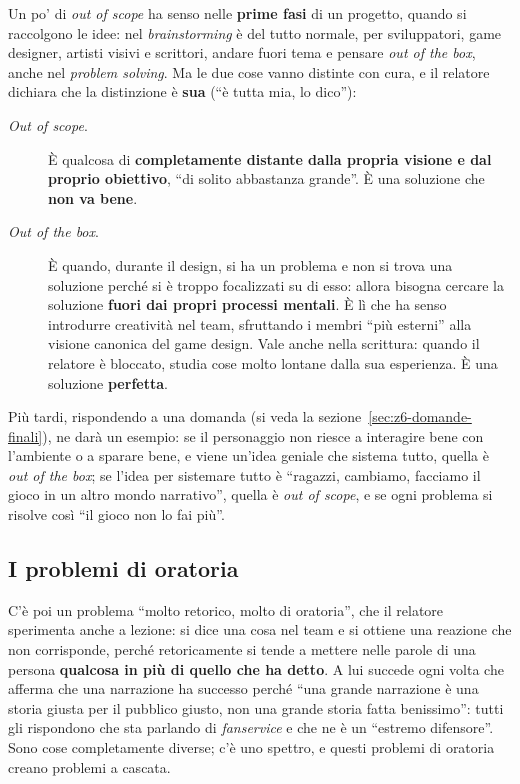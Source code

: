 Un po' di \emph{out of scope} ha senso nelle \textbf{prime fasi} di un progetto,
quando si raccolgono le idee: nel \emph{brainstorming} è del tutto normale, per
sviluppatori, game designer, artisti visivi e scrittori, andare fuori tema e
pensare \emph{out of the box}, anche nel \emph{problem solving}. Ma le due cose
vanno distinte con cura, e il relatore dichiara che la distinzione è
\textbf{sua} (``è tutta mia, lo dico''):
\begin{description}
  \item[\emph{Out of scope}.] È qualcosa di \textbf{completamente distante dalla
        propria visione e dal proprio obiettivo}, ``di solito abbastanza
        grande''. È una soluzione che \textbf{non va bene}.
  \item[\emph{Out of the box}.] È quando, durante il design, si ha un problema
        e non si trova una soluzione perché si è troppo focalizzati su di esso:
        allora bisogna cercare la soluzione \textbf{fuori dai propri processi
        mentali}. È lì che ha senso introdurre creatività nel team, sfruttando i
        membri ``più esterni'' alla visione canonica del game design. Vale anche
        nella scrittura: quando il relatore è bloccato, studia cose molto
        lontane dalla sua esperienza. È una soluzione \textbf{perfetta}.
\end{description}
Più tardi, rispondendo a una domanda (si veda la
sezione~\ref{sec:z6-domande-finali}), ne darà un esempio: se il personaggio non
riesce a interagire bene con l'ambiente o a sparare bene, e viene un'idea
geniale che sistema tutto, quella è \emph{out of the box}; se l'idea per
sistemare tutto è ``ragazzi, cambiamo, facciamo il gioco in un altro mondo
narrativo'', quella è \emph{out of scope}, e se ogni problema si risolve così
``il gioco non lo fai più''.

\subsection{I problemi di oratoria}

C'è poi un problema ``molto retorico, molto di oratoria'', che il relatore
sperimenta anche a lezione: si dice una cosa nel team e si ottiene una
reazione che non corrisponde, perché retoricamente si tende a mettere nelle
parole di una persona \textbf{qualcosa in più di quello che ha detto}. A lui
succede ogni volta che afferma che una narrazione ha successo perché ``una
grande narrazione è una storia giusta per il pubblico giusto, non una grande
storia fatta benissimo'': tutti gli rispondono che sta parlando di
\emph{fanservice} e che ne è un ``estremo difensore''. Sono cose completamente
diverse; c'è uno spettro, e questi problemi di oratoria creano problemi a
cascata.

